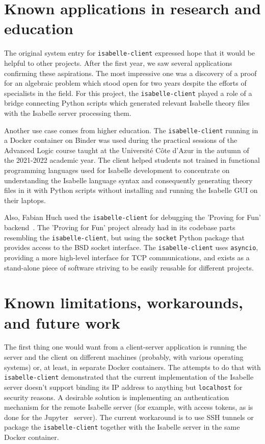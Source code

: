 \documentclass[runningheads]{llncs}
\begin{document}
\section{Known applications in research and education}
The original system entry for \texttt{isabelle-client} expressed hope that it would be helpful to other projects. After the first year, we saw several applications confirming these aspirations. The most impressive one was a discovery of a proof~\cite{DBLP:journals/corr/abs-2109-05264} for an algebraic problem which stood open for two years despite the efforts of specialists in the field. For this project, the \texttt{isabelle-client} played a role of a bridge connecting Python scripts which generated relevant Isabelle theory files with the Isabelle server processing them.

Another use case comes from higher education. The \texttt{isabelle-client} running in a Docker container on Binder was used during the practical sessions of the Advanced Logic course taught at the Université Côte d'Azur in the autumn of the 2021-2022 academic year. The client helped students not trained in functional programming languages used for Isabelle development to concentrate on understanding the Isabelle language syntax and consequently generating theory files in it with Python scripts without installing and running the Isabelle GUI on their laptops.

Also, Fabian Huch used the \texttt{isabelle-client} for debugging the 'Proving for Fun' backend~\cite{haslbeck2019competitive}. The 'Proving for Fun' project already had in its codebase parts resembling the \texttt{isabelle-client}, but using the \texttt{socket} Python package that provides access to the BSD socket interface. The \texttt{isabelle-client} uses \texttt{asyncio}, providing a more high-level interface for TCP communications, and exists as a stand-alone piece of software striving to be easily reusable for different projects.

\section{Known limitations, workarounds, and future work}
The first thing one would want from a client-server application is running the server and the client on different machines (probably, with various operating systems) or, at least, in separate Docker containers. The attempts to do that with \texttt{isabelle-client} demonstrated that the current implementation of the Isabelle server doesn't support binding its IP address to anything but \texttt{localhost} for security reasons. A desirable solution is implementing an authentication mechanism for the remote Isabelle server (for example, with access tokens, as is done for the Jupyter~\cite{DBLP:journals/cse/GrangerP21} server). The current workaround is to use SSH tunnels or package the \texttt{isabelle-client} together with the Isabelle server in the same Docker container.
\end{document}
